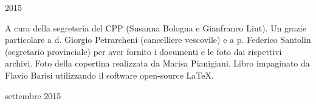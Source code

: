 \documentclass[11pt,openright,twoside]{book}
\newcommand*\cleartoleftpage{%
  \clearpage
	\thispagestyle{empty}
  \ifodd\value{page}\hbox{}\newpage\fi
}
\begin{document}
\raggedbottom %

\begin{titlepage}
        \vspace*{10mm}
			
		\vspace{10mm}
		\vspace{\fill}
		\centering \large{2015}
\end{titlepage}








\tableofcontents
\newpage
\cleartoleftpage
\thispagestyle{empty}
\null
\vfill
\noindent \small A cura della segreteria del CPP (Susanna Bologna e Gianfranco Liut).
Un grazie particolare a d. Giorgio Petrarcheni (cancelliere vescovile) e a p. Federico Santolin (segretario provinciale) per aver fornito i documenti e le foto dai rispettivi archivi. Foto della copertina realizzata da Marisa Pianigiani. Libro impaginato da Flavio Barisi utilizzando 
il software open-source \LaTeX.
\bigbreak
\begin{center}
settembre 2015
\end{center}
\end{document}
